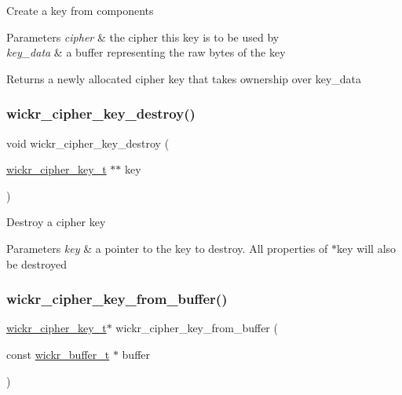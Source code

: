 Create a key from components


\begin{DoxyParams}{Parameters}
{\em cipher} & the cipher this key is to be used by \\
\hline
{\em key\+\_\+data} & a buffer representing the raw bytes of the key \\
\hline
\end{DoxyParams}
\begin{DoxyReturn}{Returns}
a newly allocated cipher key that takes ownership over \textquotesingle{}key\+\_\+data\textquotesingle{} 
\end{DoxyReturn}
\mbox{\label{group__wickr__cipher_ga45790b3023ccb261c03346b069aca763}} 
\subsubsection{\texorpdfstring{wickr\_cipher\_key\_destroy()}{wickr\_cipher\_key\_destroy()}}
{\footnotesize\ttfamily void wickr\+\_\+cipher\+\_\+key\+\_\+destroy (\begin{DoxyParamCaption}\item[{\mbox{\hyperlink{structwickr__cipher__key}{wickr\+\_\+cipher\+\_\+key\+\_\+t}} $\ast$$\ast$}]{key }\end{DoxyParamCaption})}

Destroy a cipher key


\begin{DoxyParams}{Parameters}
{\em key} & a pointer to the key to destroy. All properties of \textquotesingle{}$\ast$key\textquotesingle{} will also be destroyed \\
\hline
\end{DoxyParams}
\mbox{\label{group__wickr__cipher_ga1c073b87f2141cf35a1d91ba10f9e5ba}} 
\subsubsection{\texorpdfstring{wickr\_cipher\_key\_from\_buffer()}{wickr\_cipher\_key\_from\_buffer()}}
{\footnotesize\ttfamily \mbox{\hyperlink{structwickr__cipher__key}{wickr\+\_\+cipher\+\_\+key\+\_\+t}}$\ast$ wickr\+\_\+cipher\+\_\+key\+\_\+from\+\_\+buffer (\begin{DoxyParamCaption}\item[{const \mbox{\hyperlink{structwickr__buffer}{wickr\+\_\+buffer\+\_\+t}} $\ast$}]{buffer }\end{DoxyParamCaption})}

